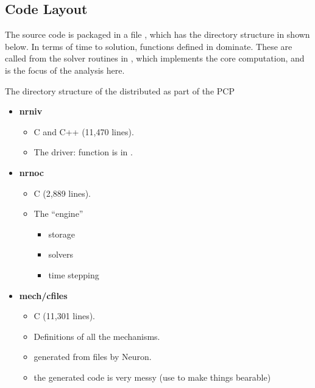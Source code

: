 \subsection{Code Layout}
The source code is packaged in a file , which has the directory structure in shown below.
In terms of time to solution, functions defined in  dominate. These are called from the solver routines in , which implements the core computation, and is the focus of the analysis here.

\begin{infobox}{The directory structure of the \neuron distributed as part of the PCP}
\begin{itemize}[leftmargin=*]
    \item \textbf{nrniv}
    \begin{itemize}
        \item C and C++ (11,470 lines).
        \item The \neuron driver:  function is in .
    \end{itemize}

    \item \textbf{nrnoc}
    \begin{itemize}
        \item C (2,889 lines).
        \item The \neuron ``engine''
        \begin{itemize}
            \item storage
            \item solvers
            \item time stepping
        \end{itemize}
    \end{itemize}

    \item \textbf{mech/cfiles}
    \begin{itemize}
        \item C (11,301 lines).
        \item Definitions of all the mechanisms.
        \item generated from \hoc files by Neuron.
        \item the generated code is very messy (use  to make things bearable)
    \end{itemize}


\end{itemize}
\end{infobox}
